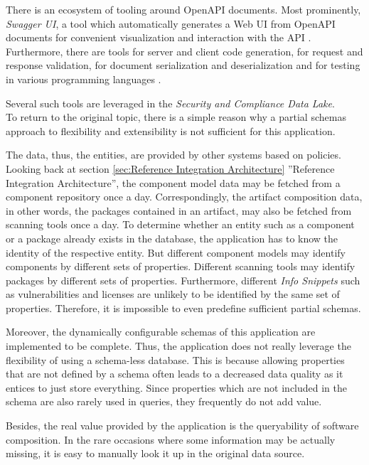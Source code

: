 There is an ecosystem of tooling around OpenAPI documents. Most prominently, \emph{Swagger UI}, a tool which automatically generates a Web UI from OpenAPI documents for convenient visualization and interaction with the API \cite{SwaggerUI}. Furthermore, there are tools for server and client code generation, for request and response validation, for document serialization and deserialization and for testing in various programming languages \cite{OpenAPISubset}.\par
Several such tools are leveraged in the \emph{Security and Compliance Data Lake}.\\

To return to the original topic, there is a simple reason why a partial schemas approach to flexibility and extensibility is not sufficient for this application.\par
The data, thus, the entities, are provided by other systems based on policies. Looking back at section \ref{sec:Reference Integration Architecture} ''Reference Integration Architecture'', the component model data may be fetched from a component repository once a day. Correspondingly, the artifact composition data, in other words, the packages contained in an artifact, may also be fetched from scanning tools once a day. To determine whether an entity such as a component or a package already exists in the database, the application has to know the identity of the respective entity. But different component models may identify components by different sets of properties. Different scanning tools may identify packages by different sets of properties. Furthermore, different \emph{Info Snippets} such as vulnerabilities and licenses are unlikely to be identified by the same set of properties. Therefore, it is impossible to even predefine sufficient partial schemas.\par 
Moreover, the dynamically configurable schemas of this application are implemented to be complete. Thus, the application does not really leverage the flexibility of using a schema-less database. This is because allowing properties that are not defined by a schema often leads to a decreased data quality as it entices to just store everything. Since properties which are not included in the schema are also rarely used in queries, they frequently do not add value.\par 
Besides, the real value provided by the application is the queryability of software composition. In the rare occasions where some information may be actually missing, it is easy to manually look it up in the original data source.  


